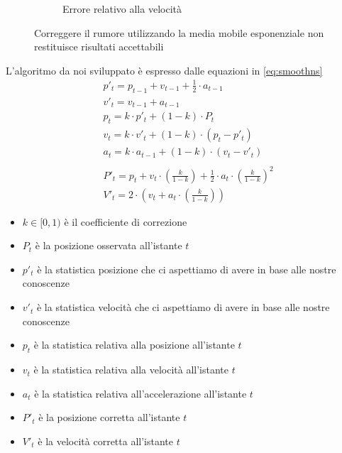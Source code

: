 \begin{figure}
\begin{subfigure}[b]{0.45\textwidth}
        \caption{Errore relativo alla velocità}
    \end{subfigure}
    \caption{Correggere il rumore utilizzando la media mobile esponenziale non restituisce risultati accettabili}
    \label{fig:lag}
\end{figure}

L'algoritmo da noi sviluppato è espresso dalle equazioni in \ref{eq:smoothns}
\begin{equation}
    \label{eq:smoothns}
    \begin{split}
        & p'_t = p_{t-1} + v_{t-1} + \frac{1}{2} \cdot a_{t-1} \\
        & v'_t = v_{t-1} + a_{t-1} \\
        & p_t = k \cdot p'_t + (1-k) \cdot P_t \\
        & v_t = k \cdot v'_t + (1-k) \cdot (p_t - p'_t) \\
        & a_t = k \cdot a_{t-1} + (1-k) \cdot (v_t - v'_t) \\
        & \\
        & P'_t = p_t + v_t \cdot \left(\frac{k}{1-k}\right) + \frac{1}{2} \cdot a_t \cdot \left(\frac{k}{1-k}\right)^2 \\
        & V'_t = 2 \cdot \left(v_t + a_t \cdot \left(\frac{k}{1-k}\right)\right)
    \end{split}
\end{equation}
\begin{itemize}
    \item $k \in [0, 1)$ è il coefficiente di correzione
    \item $P_t$ è la posizione osservata all'istante $t$
    \item $p'_t$ è la statistica posizione che ci aspettiamo di avere in base alle nostre conoscenze
    \item $v'_t$ è la statistica velocità che ci aspettiamo di avere in base alle nostre conoscenze
    \item $p_t$ è la statistica relativa alla posizione all'istante $t$
    \item $v_t$ è la statistica relativa alla velocità all'istante $t$
    \item $a_t$ è la statistica relativa all'accelerazione all'istante $t$
    \item $P'_t$ è la posizione corretta all'istante $t$
    \item $V'_t$ è la velocità corretta all'istante $t$
\end{itemize}

